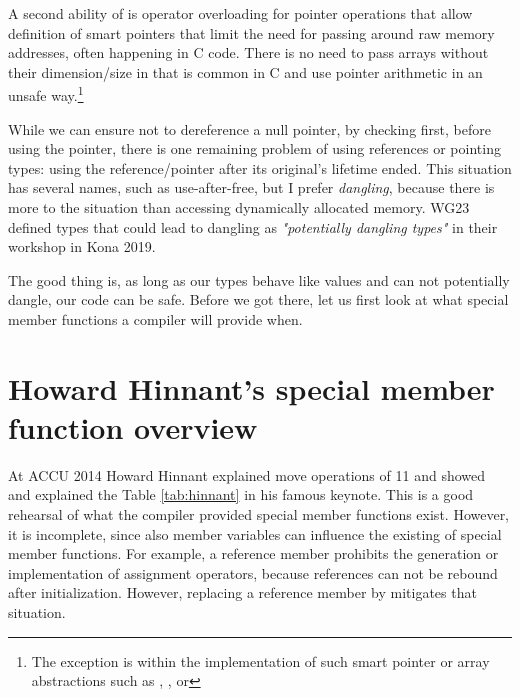 \documentclass[ebook,11pt,article]{memoir}
\begin{document}
A second ability of \Cpp{} is operator overloading for pointer operations that allow definition of smart pointers that limit the need for passing around raw memory addresses, often happening in C code. There is no need to pass arrays without their dimension/size in \Cpp{} that is common in C and use pointer arithmetic in an unsafe way.\footnote{The exception is within the implementation of such smart pointer or array abstractions such as , , or }

While we can ensure not to dereference a null pointer, by checking first, before using the pointer, there is one remaining problem of using references or pointing types: using the reference/pointer after its original's lifetime ended. This situation has several names, such as use-after-free, but I prefer \emph{dangling}, because there is more to the situation than accessing dynamically allocated memory. WG23 defined types that could lead to dangling as \emph{"potentially dangling types"} in their workshop in Kona 2019.

The good thing is, as long as our types behave like values and can not potentially dangle, our \Cpp{} code can be safe. 
Before we got there, let us first look at what special member functions a \Cpp{} compiler will provide when.



\section{Howard Hinnant's special member function overview}
At ACCU 2014 Howard Hinnant \cite{ACCU2014} explained move operations of \Cpp{}11 and showed and explained the Table \ref{tab:hinnant} in his famous keynote. This is a good rehearsal of what the compiler provided special member functions exist. However, it is incomplete, since also member variables can influence the existing of special member functions. For example, a reference member prohibits the generation or implementation of assignment operators, because references can not be rebound after initialization. However, replacing a reference member  by  mitigates that situation.
\end{document}
